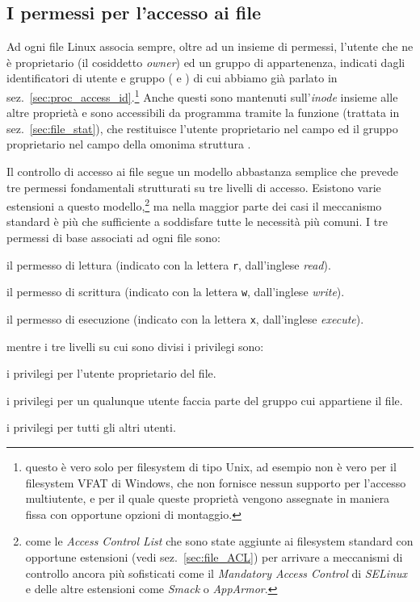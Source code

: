 \subsection{I permessi per l'accesso ai file}
\label{sec:file_perm_overview}

Ad ogni file Linux associa sempre, oltre ad un insieme di permessi, l'utente
che ne è proprietario (il cosiddetto \textit{owner}) ed un gruppo di
appartenenza, indicati dagli identificatori di utente e gruppo ( e
) di cui abbiamo già parlato in
sez.~\ref{sec:proc_access_id}.\footnote{questo è vero solo per filesystem di
  tipo Unix, ad esempio non è vero per il filesystem VFAT di Windows, che non
  fornisce nessun supporto per l'accesso multiutente, e per il quale queste
  proprietà vengono assegnate in maniera fissa con opportune opzioni di
  montaggio.}  Anche questi sono mantenuti sull'\textit{inode} insieme alle
altre proprietà e sono accessibili da programma tramite la funzione
 (trattata in sez.~\ref{sec:file_stat}), che restituisce l'utente
proprietario nel campo  ed il gruppo proprietario nel campo
 della omonima struttura .

Il controllo di accesso ai file segue un modello abbastanza semplice che
prevede tre permessi fondamentali strutturati su tre livelli di accesso.
Esistono varie estensioni a questo modello,\footnote{come le \textit{Access
    Control List} che sono state aggiunte ai filesystem standard con opportune
  estensioni (vedi sez.~\ref{sec:file_ACL}) per arrivare a meccanismi di
  controllo ancora più sofisticati come il \textit{Mandatory Access Control}
  di \textit{SELinux} e delle altre estensioni come \textit{Smack} o
  \textit{AppArmor}.} ma nella maggior parte dei casi il meccanismo standard è
più che sufficiente a soddisfare tutte le necessità più comuni.  I tre
permessi di base associati ad ogni file sono:
\begin{itemize*}
\item il permesso di lettura (indicato con la lettera \texttt{r}, dall'inglese
  \textit{read}).
\item il permesso di scrittura (indicato con la lettera \texttt{w},
  dall'inglese \textit{write}).
\item il permesso di esecuzione (indicato con la lettera \texttt{x},
  dall'inglese \textit{execute}).
\end{itemize*}
mentre i tre livelli su cui sono divisi i privilegi sono:
\begin{itemize*}
\item i privilegi per l'utente proprietario del file.
\item i privilegi per un qualunque utente faccia parte del gruppo cui
  appartiene il file.
\item i privilegi per tutti gli altri utenti.
\end{itemize*}

